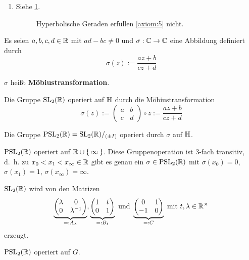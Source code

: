 \begin{beweis}
\begin{enumerate}[label=\alph*), ref=\theproposition (\alph*)]
        \item Siehe \cref{fig:hyperbolische-halbebene-axiom-5}.
            \begin{figure}[hp]
                \centering
                
                \caption{Hyperbolische Geraden erfüllen \ref{axiom:5} nicht.}
                \label{fig:hyperbolische-halbebene-axiom-5}
            \end{figure}
    \end{enumerate}
\end{beweis}

\begin{definition}%
    Es seien $a,b,c,d \in \mathbb{R}$ mit $ad - bc \neq 0$ und 
    $\sigma: \mathbb{C} \rightarrow \mathbb{C}$ eine Abbildung definiert durch 
    \[\sigma(z) := \frac{az + b}{cz+d}\]

    $\sigma$ heißt \textbf{Möbiustransformation}.
\end{definition}

\begin{proposition}%
    \begin{propenum}
        \item Die Gruppe $\mathrm{SL}_2(\mathbb{R})$ operiert auf $\mathbb{H}$ durch die Möbiustransformation
              \[\sigma(z):= \begin{pmatrix}a & b\\c & d\end{pmatrix} \circ z := \frac{az + b}{cz + d}\]
        \item Die Gruppe $\mathrm{PSL}_2(\mathbb{R}) = \mathrm{SL}_2(\mathbb{R}) /_{(\pm I)}$ operiert durch $\sigma$ auf $\mathbb{H}$.
        \item \label{prop:15.2c} $\mathrm{PSL}_2(\mathbb{R})$ operiert auf $\mathbb{R} \cup \Set{\infty}$.
              Diese Gruppenoperation ist 3-fach transitiv, d.~h. zu
              $x_0 < x_1 < x_\infty \in \mathbb{R}$ gibt es genau ein
              $\sigma \in \mathrm{PSL}_2(\mathbb{R})$ mit $\sigma(x_0) = 0$,
              $\sigma(x_1) = 1$, $\sigma(x_\infty) = \infty$.
        \item \label{prop:15.2d} $\mathrm{SL}_2(\mathbb{R})$ wird von den Matrizen
              \[\underbrace{\begin{pmatrix}\lambda & 0\\ 0 & \lambda^{-1}\end{pmatrix}}_{=: A_{\lambda}},
                \underbrace{\begin{pmatrix}1 & t\\ 0 & 1\end{pmatrix}}_{=: B_{t}} \text{ und }
                \underbrace{\begin{pmatrix}0 & 1\\-1 & 0\end{pmatrix}}_{=: C} \text{ mit } t, \lambda \in \mathbb{R}^\times\]
              erzeugt.
        \item \label{prop:15.2e} $\mathrm{PSL}_2(\mathbb{R})$ operiert auf $G$.
    \end{propenum}
\end{proposition}

